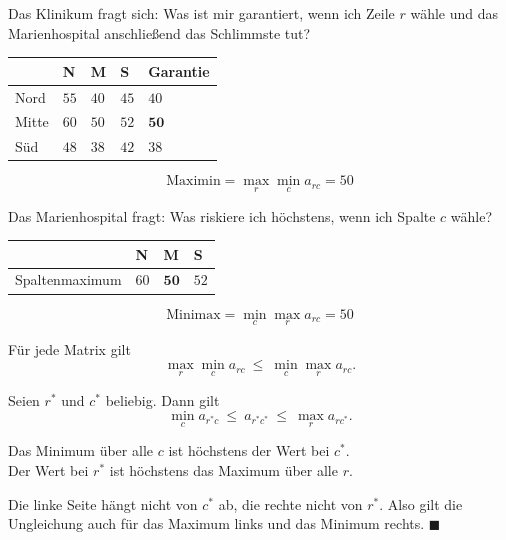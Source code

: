 \begin{merksatz}
Das Klinikum fragt sich: Was ist mir garantiert, wenn ich Zeile $r$ wähle und das Marienhospital anschließend das Schlimmste tut?

\begin{center}
{\small
\renewcommand{\arraystretch}{1.55}
\begin{tabular}{@{}P{2.0cm}P{1.4cm}P{1.4cm}P{1.4cm}P{2.0cm}@{}}
\toprule
& \textbf{N} & \textbf{M} & \textbf{S} & \textbf{Garantie}\\
\midrule
Nord & $55$ & $40$ & $45$ & $40$\\
Mitte & $60$ & $50$ & $52$ & $\mathbf{50}$\\
Süd & $48$ & $38$ & $42$ & $38$\\
\bottomrule
\end{tabular}}
\end{center}

\[ \text{Maximin} = \max_r \min_c a_{rc} = 50 \]

Das Marienhospital fragt: Was riskiere ich höchstens, wenn ich Spalte $c$ wähle?

\begin{center}
{\small
\renewcommand{\arraystretch}{1.55}
\begin{tabular}{@{}P{2.8cm}P{1.3cm}P{1.3cm}P{1.3cm}@{}}
\toprule
& \textbf{N} & \textbf{M} & \textbf{S}\\
\midrule
Spaltenmaximum & $60$ & $\mathbf{50}$ & $52$\\
\bottomrule
\end{tabular}}
\end{center}

\[ \text{Minimax} = \min_c \max_r a_{rc} = 50 \]
\end{merksatz}

\begin{merksatz}
Für jede Matrix gilt
\[ \max_r \min_c a_{rc} \ \le\ \min_c \max_r a_{rc} . \]

Seien $r^{*}$ und $c^{*}$ beliebig. Dann gilt
\[ \min_c a_{r^{*}c} \ \le\ a_{r^{*}c^{*}} \ \le\ \max_r a_{rc^{*}} . \]

 Das Minimum über alle $c$ ist höchstens der Wert bei $c^{*}$.\\
 Der Wert bei $r^{*}$ ist höchstens das Maximum über alle $r$.

Die linke Seite hängt nicht von $c^{*}$ ab, die rechte nicht von $r^{*}$. Also gilt die Ungleichung auch für das Maximum links und das Minimum rechts. $\blacksquare$

\begin{center}
\begin{minipage}{0.88\textwidth}
\end{minipage}
\end{center}
\end{merksatz}

